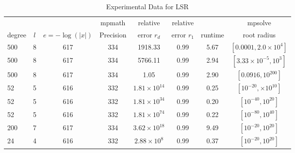 \documentclass[sigconf]{acmart}
\begin{document}
\begin{table}[t]
\caption{Experimental Data for LSR} %
\label{tab:lsr}
\vskip -0.15in
\begin{center}
\begin{small}
\begin{sc}
\begin{tabular}{lccccccc}
\toprule
&  &  & mpmath & relative  & relative &  & mpsolve \\
degree  & $l$& $e=-\log(|x|)$& Precision &error $r_d$       & error $r_1$ &runtime& root radius\\
\midrule
 500 & 8 & 617 & 334 & 1918.33 & 0.99 & 5.67 & $[0.0001,2.0 \times 10^4]$ \\ %
 500 & 8 & 617 & 334 & 5766.11 & 0.99 & 2.94 & $[3.33 \times 10^{-5},10^{3}]$\\ %
 500 & 8 & 617 & 334 & 1.05 & 0.99 & 2.90 & $[0.0916,10^{200}]$\\ %
   52 & 5 & 616 & 332 & $1.81 \times 10^{14}$ & 0.99 & 0.25 & $[10^{-20},\times 10^{10}]$\\ %
   52 & 5 & 616 & 332 & $1.81 \times 10^{34}$ & 0.99 & 0.20 & $[10^{-40}, 10^{20}]$\\ %
   52 & 5 & 616 & 332 & $1.81 \times 10^{74}$ & 0.99 & 0.22 & $[10^{-80}, 10^{40}]$\\ %
 200 & 7 & 617 & 334 & $3.62 \times 10^{18}$ & 0.99 & 9.49 & $[10^{-20}, 10^{20}]$\\ %
   24 & 4 & 616 & 332 & $2.88 \times 10^{8}$ &  0.99 & 0.37 & $[10^{-20}, 10^{20}]$\\ %
\bottomrule
\end{tabular}
\end{sc}
\end{small}
\end{center}
\vskip 0.05in
\end{table}
\end{document}
